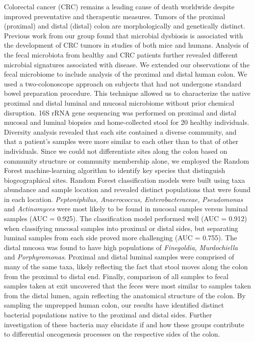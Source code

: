 \documentclass[11pt,]{article}
\begin{document}
Colorectal cancer (CRC) remains a leading cause of death worldwide
despite improved preventative and therapeutic measures. Tumors of the
proximal (proximal) and distal (distal) colon are morphologically and
genetically distinct. Previous work from our group found that microbial
dysbiosis is associated with the development of CRC tumors in studies of
both mice and humans. Analysis of the fecal microbiota from healthy and
CRC patients further revealed different microbial signatures associated
with disease. We extended our observations of the fecal microbiome to
include analysis of the proximal and distal human colon. We used a
two-colonoscope approach on subjects that had not undergone standard
bowel preparation procedure. This technique allowed us to characterize
the native proximal and distal luminal and mucosal microbiome without
prior chemical disruption. 16S rRNA gene sequencing was performed on
proximal and distal mucosal and luminal biopsies and home-collected
stool for 20 healthy individuals. Diversity analysis revealed that each
site contained a diverse community, and that a patient's samples were
more similar to each other than to that of other individuals. Since we
could not differentiate sites along the colon based on community
structure or community membership alone, we employed the Random Forest
machine-learning algorithm to identify key species that distinguish
biogeographical sites. Random Forest classification models were built
using taxa abundance and sample location and revealed distinct
populations that were found in each location. \emph{Peptoniphilus,
Anaerococcus, Enterobacteraceae, Pseudomonas} and \emph{Actinomyces}
were most likely to be found in mucosal samples versus luminal samples
(AUC = 0.925). The classification model performed well (AUC = 0.912)
when classifying mucosal samples into proximal or distal sides, but
separating luminal samples from each side proved more challenging (AUC =
0.755). The distal mucosa was found to have high populations of
\emph{Finegoldia, Murdochiella} and \emph{Porphyromonas}. Proximal and
distal luminal samples were comprised of many of the same taxa, likely
reflecting the fact that stool moves along the colon from the proximal
to distal end. Finally, comparison of all samples to fecal samples taken
at exit uncovered that the feces were most similar to samples taken from
the distal lumen, again reflecting the anatomical structure of the
colon. By sampling the unprepped human colon, our results have
identified distinct bacterial populations native to the proximal and
distal sides. Further investigation of these bacteria may elucidate if
and how these groups contribute to differential oncogenesis processes on
the respective sides of the colon.
\end{document}

